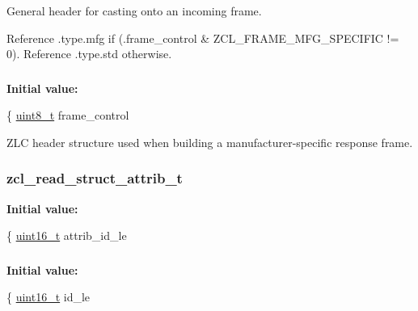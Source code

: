 General header for casting onto an incoming frame. 

Reference .type.\-mfg if (.frame\-\_\-control \& Z\-C\-L\-\_\-\-F\-R\-A\-M\-E\-\_\-\-M\-F\-G\-\_\-\-S\-P\-E\-C\-I\-F\-I\-C != 0). Reference .type.\-std otherwise. \hypertarget{group__zcl_gac376225f8ee77006b884a222a9ac25cc}{
\subsubsection[{zcl\-\_\-header\-\_\-withmfg\-\_\-t}]{}}\label{group__zcl_gac376225f8ee77006b884a222a9ac25cc}
{\bfseries Initial value\-:}
\begin{DoxyCode}
\{
   \hyperlink{group__hal_gae1affc9ca37cfb624959c866a73f83c2}{uint8\_t} frame\_control
\end{DoxyCode}


Z\-L\-C header structure used when building a manufacturer-\/specific response frame. 

\hypertarget{group__zcl_ga57caed081252123eef830fd81e8860c8}{
\subsubsection[{zcl\-\_\-read\-\_\-struct\-\_\-attrib\-\_\-t}]{\setlength{\rightskip}{0pt plus 5cm}zcl\-\_\-read\-\_\-struct\-\_\-attrib\-\_\-t}}\label{group__zcl_ga57caed081252123eef830fd81e8860c8}
{\bfseries Initial value\-:}
\begin{DoxyCode}
\{
   \hyperlink{group__hal_ga5a8b2dc9e45a9ee81a94ef304fb62505}{uint16\_t}        attrib\_id\_le
\end{DoxyCode}
\hypertarget{group__zcl_ga4c81303b52f05c2819ac615fa92e0e5f}{
\subsubsection[{zcl\-\_\-rec\-\_\-attrib\-\_\-report\-\_\-t}]{}}\label{group__zcl_ga4c81303b52f05c2819ac615fa92e0e5f}
{\bfseries Initial value\-:}
\begin{DoxyCode}
\{
   \hyperlink{group__hal_ga5a8b2dc9e45a9ee81a94ef304fb62505}{uint16\_t}  id\_le
\end{DoxyCode}


